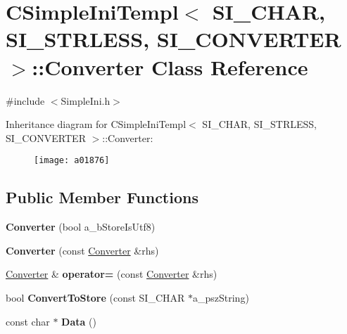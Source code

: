 \hypertarget{a01876}{}\section{C\+Simple\+Ini\+Templ$<$ S\+I\+\_\+\+C\+H\+AR, S\+I\+\_\+\+S\+T\+R\+L\+E\+SS, S\+I\+\_\+\+C\+O\+N\+V\+E\+R\+T\+ER $>$\+:\+:Converter Class Reference}
\label{a01876}


{\ttfamily \#include $<$Simple\+Ini.\+h$>$}

Inheritance diagram for C\+Simple\+Ini\+Templ$<$ S\+I\+\_\+\+C\+H\+AR, S\+I\+\_\+\+S\+T\+R\+L\+E\+SS, S\+I\+\_\+\+C\+O\+N\+V\+E\+R\+T\+ER $>$\+:\+:Converter\+:\begin{figure}[H]
\begin{center}
\leavevmode
\texttt{[image: a01876]}
\end{center}
\end{figure}
\subsection*{Public Member Functions}
\begin{DoxyCompactItemize}
\item 
\mbox{\label{a01876_ab8e740b211e4ece127d4d25773ba7e42}} 
{\bfseries Converter} (bool a\+\_\+b\+Store\+Is\+Utf8)
\item 
\mbox{\label{a01876_a2f6e993014ed5d60c6e890e55beb0805}} 
{\bfseries Converter} (const \hyperlink{a01876}{Converter} \&rhs)
\item 
\mbox{\label{a01876_af858c01c6a7e4ce9fafd18abc9e0ac1b}} 
\hyperlink{a01876}{Converter} \& {\bfseries operator=} (const \hyperlink{a01876}{Converter} \&rhs)
\item 
\mbox{\label{a01876_a4e4186867214b54326cf622e323c9f2f}} 
bool {\bfseries Convert\+To\+Store} (const S\+I\+\_\+\+C\+H\+AR $\ast$a\+\_\+psz\+String)
\item 
\mbox{\label{a01876_a918bbd4f861a2872e148bc9481ac80bb}} 
const char $\ast$ {\bfseries Data} ()
\end{DoxyCompactItemize}


